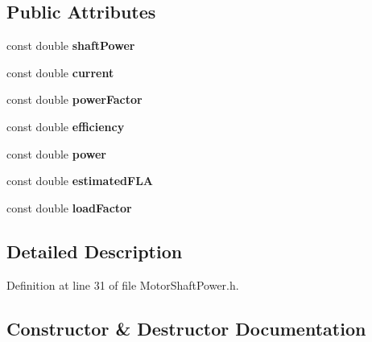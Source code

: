 \subsection*{Public Attributes}
\begin{DoxyCompactItemize}
\item 
\mbox{\label{struct_motor_shaft_power_1_1_output_a9f24851400a9d1f70cc685a0192e35c4}} 
const double {\bfseries shaft\+Power}
\item 
\mbox{\label{struct_motor_shaft_power_1_1_output_a8b1d0a174e3c91bd18ea06b560478c21}} 
const double {\bfseries current}
\item 
\mbox{\label{struct_motor_shaft_power_1_1_output_a603a8e7219d775f20f965bd75a1204f4}} 
const double {\bfseries power\+Factor}
\item 
\mbox{\label{struct_motor_shaft_power_1_1_output_abb253d637322c453d33afa78d16b4b85}} 
const double {\bfseries efficiency}
\item 
\mbox{\label{struct_motor_shaft_power_1_1_output_abaab2f27d778f41e56ff7a7398a4713a}} 
const double {\bfseries power}
\item 
\mbox{\label{struct_motor_shaft_power_1_1_output_a9fc50f9df95d6507017c5a3c306bbc7f}} 
const double {\bfseries estimated\+F\+LA}
\item 
\mbox{\label{struct_motor_shaft_power_1_1_output_a35fe60244887331ad2ae8ede8c5ab995}} 
const double {\bfseries load\+Factor}
\end{DoxyCompactItemize}


\subsection{Detailed Description}


Definition at line 31 of file Motor\+Shaft\+Power.\+h.



\subsection{Constructor \& Destructor Documentation}
\mbox{\label{struct_motor_shaft_power_1_1_output_a64e2082ec024a9a20038dd306533bfa7}} 
